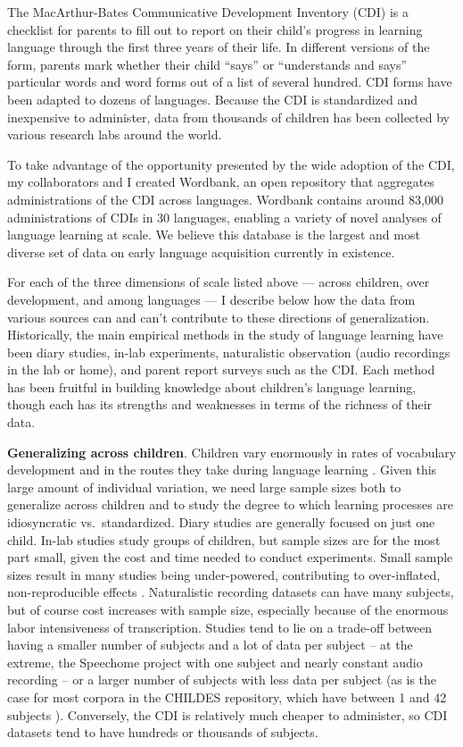 \documentclass[
   11pt,
       ]{book}
\begin{document}
The MacArthur-Bates Communicative Development Inventory (CDI) is a checklist for parents to fill out to report on their child's progress in learning language through the first three years of their life. In different versions of the form, parents mark whether their child ``says'' or ``understands and says'' particular words and word forms out of a list of several hundred. CDI forms have been adapted to dozens of languages. Because the CDI is standardized and inexpensive to administer, data from thousands of children has been collected by various research labs around the world.

To take advantage of the opportunity presented by the wide adoption of the CDI, my collaborators and I created Wordbank, an open repository that aggregates administrations of the CDI across languages. Wordbank contains around 83,000 administrations of CDIs in 30 languages, enabling a variety of novel analyses of language learning at scale. We believe this database is the largest and most diverse set of data on early language acquisition currently in existence.

For each of the three dimensions of scale listed above --- across children, over development, and among languages --- I describe below how the data from various sources can and can't contribute to these directions of generalization. Historically, the main empirical methods in the study of language learning have been diary studies, in-lab experiments, naturalistic observation (audio recordings in the lab or home), and parent report surveys such as the CDI. Each method has been fruitful in building knowledge about children's language learning, though each has its strengths and weaknesses in terms of the richness of their data.

\textbf{Generalizing across children}. Children vary enormously in rates of vocabulary development \citep{fenson1994, frank2021} and in the routes they take during language learning \citep{nelson1973, bates1991, bates1994, frank2021}. Given this large amount of individual variation, we need large sample sizes both to generalize across children and to study the degree to which learning processes are idiosyncratic vs.~standardized. Diary studies are generally focused on just one child. In-lab studies study groups of children, but sample sizes are for the most part small, given the cost and time needed to conduct experiments. Small sample sizes result in many studies being under-powered, contributing to over-inflated, non-reproducible effects \citep{button2013, osc2012}. Naturalistic recording datasets can have many subjects, but of course cost increases with sample size, especially because of the enormous labor intensiveness of transcription. Studies tend to lie on a trade-off between having a smaller number of subjects and a lot of data per subject -- at the extreme, the Speechome project with one subject and nearly constant audio recording \citep{roy2015} -- or a larger number of subjects with less data per subject (as is the case for most corpora in the CHILDES repository, which have between 1 and 42 subjects \citep{macwhinney2000}). Conversely, the CDI is relatively much cheaper to administer, so CDI datasets tend to have hundreds or thousands of subjects.
\end{document}

